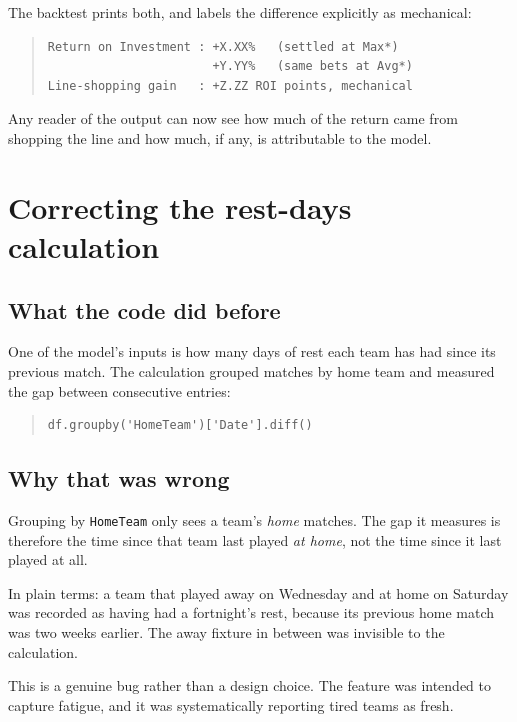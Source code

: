 \documentclass[11pt,a4paper]{article}
\newcommand{\code}[1]{\texttt{#1}}
\begin{document}
The backtest prints both, and labels the difference explicitly as mechanical:

\begin{quote}\small
\begin{verbatim}
Return on Investment : +X.XX%   (settled at Max*)
                       +Y.YY%   (same bets at Avg*)
Line-shopping gain   : +Z.ZZ ROI points, mechanical
\end{verbatim}
\end{quote}

Any reader of the output can now see how much of the return came from
shopping the line and how much, if any, is attributable to the model.

\section{Correcting the rest-days calculation}

\subsection{What the code did before}

One of the model's inputs is how many days of rest each team has had since
its previous match. The calculation grouped matches by home team and measured
the gap between consecutive entries:

\begin{quote}\small
\begin{verbatim}
df.groupby('HomeTeam')['Date'].diff()
\end{verbatim}
\end{quote}

\subsection{Why that was wrong}

Grouping by \code{HomeTeam} only sees a team's \emph{home} matches. The gap it
measures is therefore the time since that team last played \emph{at home},
not the time since it last played at all.

In plain terms: a team that played away on Wednesday and at home on Saturday
was recorded as having had a fortnight's rest, because its previous home
match was two weeks earlier. The away fixture in between was invisible to the
calculation.

This is a genuine bug rather than a design choice. The feature was intended
to capture fatigue, and it was systematically reporting tired teams as fresh.
\end{document}

